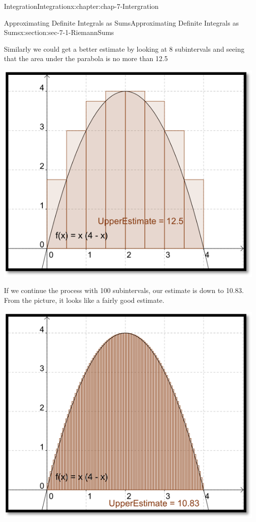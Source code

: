 \documentclass[oneside,10pt,]{book}
\numberwithin{equation}{section}
\begin{document}
\begin{chapterptx}{Integration}{}{Integration}{}{}{x:chapter:chap-7-Intergration}
\begin{sectionptx}{Approximating Definite Integrals as Sums}{}{Approximating Definite Integrals as Sums}{}{}{x:section:sec-7-1-RiemannSums}
\begin{sidebyside}{1}{0.2}{0.2}{0}
\begin{sbspanel}{0.6}
\end{sbspanel}%
\end{sidebyside}%
\par
Similarly we could get a better estimate by looking at 8 subintervals and seeing that the area under the parabola is no more than 12.5%
\begin{sidebyside}{1}{0.2}{0.2}{0}%
\begin{sbspanel}{0.6}%
\includegraphics[width=\linewidth]{images/sec7-1-5.png}
\end{sbspanel}%
\end{sidebyside}%
\par
If we continue the process with 100 subintervals, our estimate is down to 10.83.  From the picture, it looks like a fairly good estimate.%
\begin{sidebyside}{1}{0.2}{0.2}{0}%
\begin{sbspanel}{0.6}%
\includegraphics[width=\linewidth]{images/sec7-1-6.png}

\end{sbspanel}
\end{sidebyside}
\end{sectionptx}
\end{chapterptx}
\end{document}

